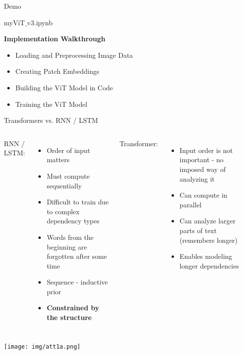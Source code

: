 \documentclass{beamer}
\newcommand{\eptfootnote}[1]{{%
  \let\thempfn\relax%
  \footnotetext[0]{\emph{#1}}%
}}
\begin{document}
\begin{frame}{Demo}
\bigskip
\begin{center}
myViT$\_$v3.ipynb
\end{center}
\bigskip
\textbf{ Implementation Walkthrough}

    \begin{itemize}
        \item Loading and Preprocessing Image Data
        
        \item Creating Patch Embeddings
       
        \item Building the ViT Model in Code
       
        \item Training the ViT Model
        
    \end{itemize}

\end{frame}


\begin{frame}{Transformers vs. RNN / LSTM}

\begin{columns}
RNN / LSTM:
\begin{itemize}

\item Order of input matters
\item Must compute sequentially
\item Difficult to train due to complex dependency types
\item Words from the beginning are forgotten after some time
\item Sequence - inductive prior
\item \textbf{Constrained by the structure}

\end{itemize}
Transformer: 
\begin{itemize}
\item Input order is not important - no imposed way of analyzing it
\item Can compute in parallel 
\item Can analyze larger parts of text (remembers longer) 
\item Enables modeling longer dependencies 

\end{itemize}
\end{columns}
\begin{center}
\texttt{[image: img/att1a.png]} 
\end{center}
\end{frame}
\end{document}
